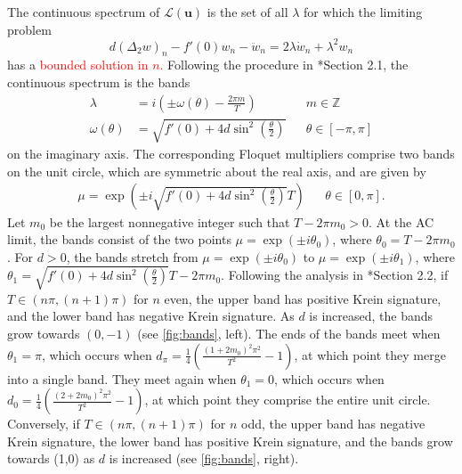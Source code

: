 \documentclass[12pt,reqno]{amsart}
\def\Z{{\mathbb Z}}
\def\calL{\mathcal{L}}
\newcommand{\uvec}{\mathbf{u}}
\theoremstyle{definition}
\newcommand{\revised}[1]{ \textcolor{red}{#1} }
\begin{document}
The continuous spectrum of $\calL(\uvec)$ is the set of all $\lambda$ for which the limiting problem 
\begin{equation}\label{eq:DKGeigcont}
d (\Delta_2 w)_n - f'(0)w_n - \ddot{w}_n = 2 \lambda \dot{w}_n + \lambda^2 w_n
\end{equation}
has a 
\revised{
bounded solution in $n$. 
}
Following the procedure in \cite{cuevas-maraver2016}*{Section 2.1}, the continuous spectrum is the bands
\begin{equation}\label{eq:contspec}
\begin{aligned}
\lambda &= i\left( \pm \omega(\theta) - \frac{2 \pi m}{T} \right) && m \in \Z \\
\omega(\theta) &= \sqrt{ f'(0) + 4 d \sin^2\left( \frac{\theta}{2} \right) } && \theta \in [-\pi, \pi]
\end{aligned}
\end{equation}
on the imaginary axis. The corresponding Floquet multipliers comprise two bands on the unit circle,  which are symmetric about the real axis, and are given by
\begin{equation}\label{eq:contspecmult}
\begin{aligned}
\mu = \exp \left( \pm i \sqrt{f'(0) + 4 d \sin^2 \left(\frac{\theta}{2}\right) }T \right)  && \theta \in [0, \pi].
\end{aligned}
\end{equation}
Let $m_0$ be the largest nonnegative integer such that $T - 2 \pi m_0 > 0$. At the AC limit, the bands consist of the two points $\mu = \exp(\pm i \theta_0)$, where $\theta_0 =  T - 2 \pi m_0$. For $d>0$, the bands stretch from $\mu = \exp(\pm i \theta_0)$ to $\mu = \exp(\pm i \theta_1)$, where $\theta_1 = \sqrt{f'(0) + 4 d \sin^2 \left(\frac{\theta}{2}\right) }T - 2 \pi m_0$. Following the analysis in \cite{cuevas-maraver2016}*{Section 2.2}, if $T \in (n \pi, (n+1)\pi)$ for $n$ even, the upper band has positive Krein signature, and the lower band has negative Krein signature. As $d$ is increased, the bands grow towards $(0,-1)$ (see \cref{fig:bands}, left). The ends of the bands meet when $\theta_1 = \pi$, which occurs when $d_{\pi} = \frac{1}{4} \left( \frac{(1 + 2 m_0)^2 \pi^2}{T^2} - 1\right)$, at which point they merge into a single band. They meet again when $\theta_1 = 0$, which occurs when $d_0 = \frac{1}{4} \left( \frac{(2 + 2 m_0)^2 \pi^2}{T^2} - 1\right)$, at which point they comprise the entire unit circle.
Conversely, if $T \in (n \pi, (n+1)\pi)$ for $n$ odd, the upper band has negative Krein signature, the lower band has positive Krein signature, and the bands grow towards (1,0) as $d$ is increased (see \cref{fig:bands}, right).
\end{document}
